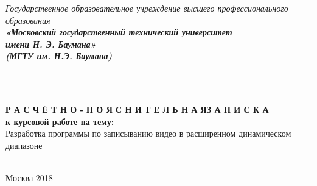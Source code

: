 


\begin{center}
	\hfill \break
	\textit{
		\normalsize{Государственное образовательное учреждение высшего профессионального образования}}\\ 
	
	\textit{
		\normalsize  {\bf  «Московский государственный технический университет}\\ 
		\normalsize  {\bf имени Н. Э. Баумана»}\\
		\normalsize  {\bf (МГТУ им. Н.Э. Баумана)}\\
	}
	\noindent\rule{\textwidth}{2pt}
	\hfill \break
	\noindent
	\\
	\noindent
	\\
	\hfill\break
	\hfill \break
	\hfill \break
	\hfill \break
	\normalsize{\bf Р А С Ч Ё Т Н О - П О Я С Н И Т Е Л Ь Н А Я\space\space З А П И С К А}\\
	\normalsize{\bf к курсовой работе на тему:}\\
	\hfill \break
	\large{Разработка программы по записыванию видео в расширенном динамическом диапазоне}\\
	\hfill \break
	\hfill \break
	\hfill \break
	\hfill \break
	\hfill \break	
	\normalsize {
		\noindent
		\makebox[\textwidth][c]{}%
	}\\
	\hfill \break	
	\normalsize {
		\noindent
		\makebox[\textwidth][c]{ ~~~~~~~~      }%
	}
	\hfill \break
	\hfill \break
	\hfill \break
	\hfill \break
\end{center}
\hfill \break
\hfill \break
\begin{center} Москва 2018\end{center}

\thispagestyle{empty} %


